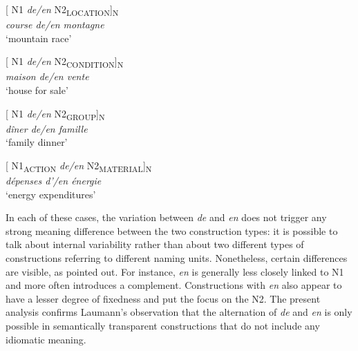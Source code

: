 \documentclass[output=paper]{langsci/langscibook}
\begin{document}
\begin{exe}\ex\begin{minipage}[t]{0.4\textwidth}    %
[ N1 \textit{de/en} N2\textsubscript{LOCATION}]\textsubscript{N}\\
\textit{course de/en montagne}\\
`mountain race'
\end{minipage}\hfill%
\begin{minipage}[t]{0.45\textwidth}
[ N1 \textit{de/en} N2\textsubscript{CONDITION}]\textsubscript{N}\\
\textit{maison de/en vente}\\
`house for sale'
\end{minipage}
\end{exe}

\begin{exe}\ex\begin{minipage}[t]{0.4\textwidth}    %
[ N1 \textit{de/en} N2\textsubscript{GROUP}]\textsubscript{N}\\
\textit{dîner de/en famille}\\
`family dinner'
\end{minipage}\hfill            %
\begin{minipage}[t]{0.45\textwidth}
[ N1\textsubscript{ACTION} \textit{de/en} N2\textsubscript{MATERIAL}]\textsubscript{N}\\
\textit{dépenses d'/en énergie }\\
`energy expenditures'
\end{minipage}
\end{exe}

In each of these cases, the variation between \textit{de} and \textit{en} does not trigger any strong meaning difference between the two construction types: it is possible to talk about internal variability rather than about two different types of constructions referring to different naming units. Nonetheless, certain differences are visible, as \citet{Laumann:1998} pointed out. For instance, \textit{en} is generally less closely linked to N1 and more often introduces a complement. Constructions with \textit{en} also appear to have a lesser degree of fixedness and put the focus on the N2. The present analysis confirms Laumann’s observation that the alternation of \textit{de} and \textit{en} is only possible in semantically transparent constructions that do not include any idiomatic meaning.\\   
\end{document}
